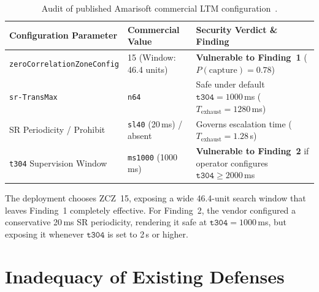 \begin{table}[htbp]
  \centering
  \caption{Audit of published Amarisoft commercial LTM configuration~\cite{amarisoft2026ltm}.}
  \label{tab:deployed}
  \small
  \begin{tabularx}{\textwidth}{@{}p{5.0cm} p{3.2cm} X@{}}
    \toprule
    Configuration Parameter & Commercial Value & Security Verdict \& Finding \\
    \midrule
    \texttt{zero\-Correlation\-Zone\-Config} & 15 (Window: 46.4 units) & \textbf{Vulnerable to Finding~1} ($P(\text{capture})=0.78$) \\
    \texttt{sr-TransMax} & \texttt{n64} & Safe under default $\texttt{t304} = 1000$\,ms ($T_{\text{exhaust}} = 1280$\,ms) \\
    SR Periodicity / Prohibit & \texttt{sl40} (20\,ms) / absent & Governs escalation time ($T_{\text{exhaust}} = 1.28$\,s) \\
    \texttt{t304} Supervision Window & \texttt{ms1000} (1000\,ms) & \textbf{Vulnerable to Finding~2} if operator configures $\texttt{t304} \ge 2000$\,ms \\
    \bottomrule
  \end{tabularx}
\end{table}

The deployment chooses ZCZ~15, exposing a wide 46.4-unit search window that leaves Finding~1 completely
effective. For Finding~2, the vendor configured a conservative 20\,ms SR periodicity, rendering it
safe at $\texttt{t304}=1000$\,ms, but exposing it whenever $\texttt{t304}$ is set to 2\,s or higher.

\section{Inadequacy of Existing Defenses}
\label{sec:detect}

